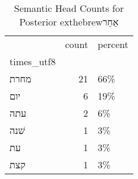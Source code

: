 \begin{table}[htbp!]
\centering
\caption{Semantic Head Counts for Posterior 	exthebrew{אַחַר}}
\label{table:post_MN_head_ct}
\begin{tabular}{lrl}
\toprule
{} &  count & percent \\
times\_utf8 &        &         \\
\midrule
מחרת       &     21 &     66\% \\
יום        &      6 &     19\% \\
עתה        &      2 &      6\% \\
שׁנה       &      1 &      3\% \\
עת         &      1 &      3\% \\
קצת        &      1 &      3\% \\
\bottomrule
\end{tabular}
\end{table}
